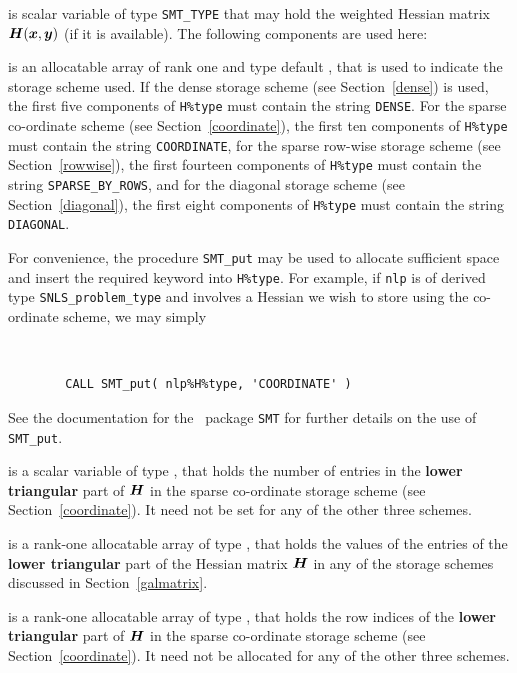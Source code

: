\documentclass{galahad}
\newcommand{\packagename}{SNLS}
\begin{document}
\begin{description}
 is scalar variable of type {\tt SMT\_TYPE} that may hold the
weighted Hessian matrix ${\bm{H}}({\bm{x}},{\bm{y}})$ (if it is available).
The following components are used here:

\begin{description}

 is an allocatable array of rank one and type default
\character, that
is used to indicate the storage scheme used. If the dense storage scheme
(see Section~\ref{dense}) is used,
the first five components of {\tt H\%type} must contain the
string {\tt DENSE}.
For the sparse co-ordinate scheme (see Section~\ref{coordinate}),
the first ten components of {\tt H\%type} must contain the
string {\tt COORDINATE},
for the sparse row-wise storage scheme (see Section~\ref{rowwise}),
the first fourteen components of {\tt H\%type} must contain the
string {\tt SPARSE\_BY\_ROWS},
and for the diagonal storage scheme (see Section~\ref{diagonal}),
the first eight components of {\tt H\%type} must contain the
string {\tt DIAGONAL}.

For convenience, the procedure {\tt SMT\_put}
may be used to allocate sufficient space and insert the required keyword
into {\tt H\%type}.
For example, if {\tt nlp} is of derived type {\tt \packagename\_problem\_type}
and involves a Hessian we wish to store using the co-ordinate scheme,
we may simply
{\tt
\begin{verbatim}
        CALL SMT_put( nlp%H%type, 'COORDINATE' )
\end{verbatim}
}
\noindent
See the documentation for the \galahad\ package {\tt SMT}
for further details on the use of {\tt SMT\_put}.

 is a scalar variable of type \integer, that
holds the number of entries in the {\bf lower triangular} part of ${\bm{H}}$
in the sparse co-ordinate storage scheme (see Section~\ref{coordinate}).
It need not be set for any of the other three schemes.

 is a rank-one allocatable array of type \realdp, that holds
the values of the entries of the {\bf lower triangular} part
of the Hessian matrix ${\bm{H}}$ in any of the
storage schemes discussed in Section~\ref{galmatrix}.

 is a rank-one allocatable array of type \integer,
that holds the row indices of the {\bf lower triangular} part of ${\bm{H}}$
in the sparse co-ordinate storage
scheme (see Section~\ref{coordinate}).
It need not be allocated for any of the other three schemes.


\end{description}
\end{description}
\end{document}
